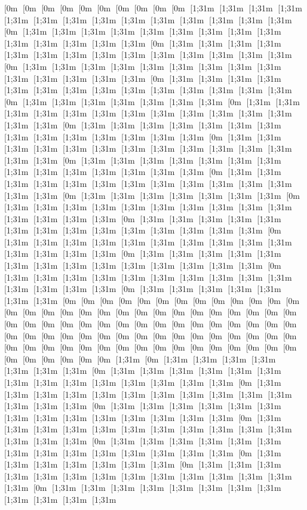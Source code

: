 [0m [0m [0m [0m [0m [0m [0m [0m [0m [0m [1;31m [1;31m [1;31m [1;31m [1;31m [1;31m [1;31m [1;31m [1;31m [1;31m [1;31m [1;31m [1;31m [1;31m [0m [1;31m [1;31m [1;31m [1;31m [1;31m [1;31m [1;31m [1;31m [1;31m [1;31m [1;31m [1;31m [1;31m [1;31m [0m [1;31m [1;31m [1;31m [1;31m [1;31m [1;31m [1;31m [1;31m [1;31m [1;31m [1;31m [1;31m [1;31m [1;31m [0m [1;31m [1;31m [1;31m [1;31m [1;31m [1;31m [1;31m [1;31m [1;31m [1;31m [1;31m [1;31m [1;31m [1;31m [0m [1;31m [1;31m [1;31m [1;31m [1;31m [1;31m [1;31m [1;31m [1;31m [1;31m [1;31m [1;31m [1;31m [1;31m [0m [1;31m [1;31m [1;31m [1;31m [1;31m [1;31m [1;31m [0m [1;31m [1;31m [1;31m [1;31m [1;31m [1;31m [1;31m [1;31m [1;31m [1;31m [1;31m [1;31m [1;31m [1;31m [0m [1;31m [1;31m [1;31m [1;31m [1;31m [1;31m [1;31m [1;31m [1;31m [1;31m [1;31m [1;31m [1;31m [1;31m [0m [1;31m [1;31m [1;31m [1;31m [1;31m [1;31m [1;31m [1;31m [1;31m [1;31m [1;31m [1;31m [1;31m [1;31m [0m [1;31m [1;31m [1;31m [1;31m [1;31m [1;31m [1;31m [1;31m [1;31m [1;31m [1;31m [1;31m [1;31m [1;31m [0m [1;31m [1;31m [1;31m [1;31m [1;31m [1;31m [1;31m [1;31m [1;31m [1;31m [1;31m [1;31m [1;31m [1;31m [0m [1;31m [1;31m [1;31m [1;31m [1;31m [1;31m [1;31m [0m [1;31m [1;31m [1;31m [1;31m [1;31m [1;31m [1;31m [1;31m [1;31m [1;31m [1;31m [1;31m [1;31m [1;31m [0m [1;31m [1;31m [1;31m [1;31m [1;31m [1;31m [1;31m [1;31m [1;31m [1;31m [1;31m [1;31m [1;31m [1;31m [0m [1;31m [1;31m [1;31m [1;31m [1;31m [1;31m [1;31m [1;31m [1;31m [1;31m [1;31m [1;31m [1;31m [1;31m [0m [1;31m [1;31m [1;31m [1;31m [1;31m [1;31m [1;31m [1;31m [1;31m [1;31m [1;31m [1;31m [1;31m [1;31m [0m [1;31m [1;31m [1;31m [1;31m [1;31m [1;31m [1;31m [1;31m [1;31m [1;31m [1;31m [1;31m [1;31m [1;31m [0m [1;31m [1;31m [1;31m [1;31m [1;31m [1;31m [1;31m [0m [0m [0m [0m [0m [0m [0m [0m [0m [0m [0m [0m [0m [0m [0m [0m [0m [0m [0m [0m [0m [0m [0m [0m [0m [0m [0m [0m [0m [0m [0m [0m [0m [0m [0m [0m [0m [0m [0m [0m [0m [0m [0m [0m [0m [0m [0m [0m [0m [0m [0m [0m [0m [0m [0m [0m [0m [0m [0m [0m [0m [0m [0m [0m [0m [0m [0m [0m [0m [0m [0m [0m [0m [0m [0m [0m [0m [0m [0m [0m [0m [0m [0m [1;31m [0m [1;31m [1;31m [1;31m [1;31m [1;31m [1;31m [1;31m [0m [1;31m [1;31m [1;31m [1;31m [1;31m [1;31m [1;31m [1;31m [1;31m [1;31m [1;31m [1;31m [1;31m [1;31m [0m [1;31m [1;31m [1;31m [1;31m [1;31m [1;31m [1;31m [1;31m [1;31m [1;31m [1;31m [1;31m [1;31m [1;31m [0m [1;31m [1;31m [1;31m [1;31m [1;31m [1;31m [1;31m [1;31m [1;31m [1;31m [1;31m [1;31m [1;31m [1;31m [0m [1;31m [1;31m [1;31m [1;31m [1;31m [1;31m [1;31m [1;31m [1;31m [1;31m [1;31m [1;31m [1;31m [1;31m [0m [1;31m [1;31m [1;31m [1;31m [1;31m [1;31m [1;31m [1;31m [1;31m [1;31m [1;31m [1;31m [1;31m [1;31m [0m [1;31m [1;31m [1;31m [1;31m [1;31m [1;31m [1;31m [0m [1;31m [1;31m [1;31m [1;31m [1;31m [1;31m [1;31m [1;31m [1;31m [1;31m [1;31m [1;31m [1;31m [1;31m [0m [1;31m [1;31m [1;31m [1;31m [1;31m [1;31m [1;31m [1;31m [1;31m [1;31m [1;31m [1;31m 